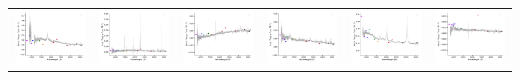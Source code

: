 \begin{center}
\begin{longtable}{l l l l l l }
    \includegraphics[width=0.3\linewidth, clip]{Figs/Figs-sdss/spec-9163-58043-0440-STRIPE82-0120-045064.pdf} & \includegraphics[width=0.3\linewidth, clip]{Figs/Figs-sdss/spec-9166-58051-0118-STRIPE82-0132-037548.pdf} & \includegraphics[width=0.3\linewidth, clip]{Figs/Figs-sdss/spec-9168-58067-0396-STRIPE82-0136-026983.pdf} & \includegraphics[width=0.3\linewidth, clip]{Figs/Figs-sdss/spec-9172-58015-0449-STRIPE82-0148-018355.pdf} & \includegraphics[width=0.3\linewidth, clip]{Figs/Figs-sdss/spec-9180-57693-0793-STRIPE82-0120-000615.pdf} & \includegraphics[width=0.3\linewidth, clip]{Figs/Figs-sdss/spec-9180-57693-0928-STRIPE82-0121-040706.pdf} \\

\end{longtable}
\end{center}
